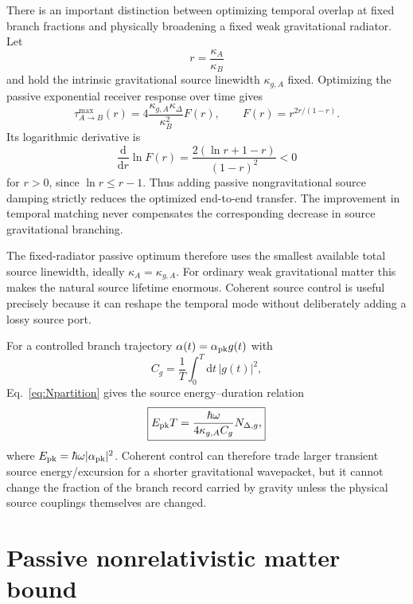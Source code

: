 \documentclass[11pt]{article}
\newcommand{\dd}{\mathrm{d}}
\begin{document}
There is an important distinction between optimizing temporal overlap at fixed branch fractions and physically broadening a fixed weak gravitational radiator. Let
\begin{equation}
r=\frac{\kappa_A}{\kappa_B}
\end{equation}
and hold the intrinsic gravitational source linewidth $\kappa_{g,A}$ fixed. Optimizing the passive exponential receiver response over time gives
\begin{equation}
\boxed{
\tau_{A\to B}^{\max}(r)
=4\frac{\kappa_{g,A}\kappa_\Delta}{\kappa_B^2}
F(r),
\qquad
F(r)=r^{2r/(1-r)}.
}
\label{eq:Fpassive}
\end{equation}
Its logarithmic derivative is
\begin{equation}
\frac{\dd}{\dd r}\ln F(r)
=\frac{2(\ln r+1-r)}{(1-r)^2}<0
\end{equation}
for $r>0$, since $\ln r\le r-1$. Thus adding passive nongravitational source damping strictly reduces the optimized end-to-end transfer. The improvement in temporal matching never compensates the corresponding decrease in source gravitational branching.

The fixed-radiator passive optimum therefore uses the smallest available total source linewidth, ideally $\kappa_A=\kappa_{g,A}$. For ordinary weak gravitational matter this makes the natural source lifetime enormous. Coherent source control is useful precisely because it can reshape the temporal mode without deliberately adding a lossy source port.

For a controlled branch trajectory $\alpha(t)=\alpha_{\rm pk}g(t)$ with
\begin{equation}
C_g=\frac1T\int_0^T\dd t\,|g(t)|^2,
\end{equation}
Eq.~\eqref{eq:Npartition} gives the source energy--duration relation
\begin{equation}
\boxed{
E_{\rm pk}T
=\frac{\hbar\omega}{4\kappa_{g,A}C_g}
N_{\Delta,g},
}
\label{eq:ETcost}
\end{equation}
where $E_{\rm pk}=\hbar\omega|\alpha_{\rm pk}|^2$. Coherent control can therefore trade larger transient source energy/excursion for a shorter gravitational wavepacket, but it cannot change the fraction of the branch record carried by gravity unless the physical source couplings themselves are changed.

\section{Passive nonrelativistic matter bound}
\label{sec:passive-bound}
\end{document}
